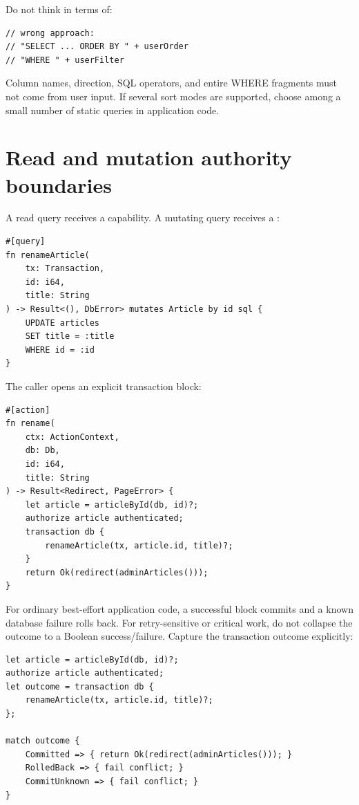Do not think in terms of:

\begin{lstlisting}
// wrong approach:
// "SELECT ... ORDER BY " + userOrder
// "WHERE " + userFilter
\end{lstlisting}

Column names,  direction, SQL operators, and entire WHERE fragments must not come from user input. If several sort modes are supported, choose among a small number of static queries in application code.

\section{Read and mutation authority boundaries}

A read query receives a  capability. A mutating query receives a :

\begin{lstlisting}[language=Velran]
#[query]
fn renameArticle(
    tx: Transaction,
    id: i64,
    title: String
) -> Result<(), DbError> mutates Article by id sql {
    UPDATE articles
    SET title = :title
    WHERE id = :id
}
\end{lstlisting}

The caller opens an explicit transaction block:

\begin{lstlisting}[language=Velran]
#[action]
fn rename(
    ctx: ActionContext,
    db: Db,
    id: i64,
    title: String
) -> Result<Redirect, PageError> {
    let article = articleById(db, id)?;
    authorize article authenticated;
    transaction db {
        renameArticle(tx, article.id, title)?;
    }
    return Ok(redirect(adminArticles()));
}
\end{lstlisting}

For ordinary best-effort application code, a successful block commits and a known database failure rolls back. For retry-sensitive or critical work, do not collapse the outcome to a Boolean success/failure. Capture the transaction outcome explicitly:

\begin{lstlisting}[language=Velran]
let article = articleById(db, id)?;
authorize article authenticated;
let outcome = transaction db {
    renameArticle(tx, article.id, title)?;
};

match outcome {
    Committed => { return Ok(redirect(adminArticles())); }
    RolledBack => { fail conflict; }
    CommitUnknown => { fail conflict; }
}
\end{lstlisting}

